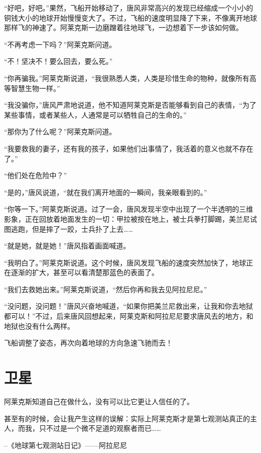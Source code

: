 “好吧，好吧。”果然，飞船开始移动了，唐风非常高兴的发现已经缩成一个小小的铜钱大小的地球开始慢慢变大了。不过，飞船的速度明显降了下来，不像离开地球那样飞的神速了。阿莱克斯一边磨蹭着往地球飞，一边想着下一步该如何做。

“不再考虑一下吗？”阿莱克斯问道。

“不！坚决不！要么回去，要么死。”

“你再骗我。”阿莱克斯说道，“我很熟悉人类，人类是珍惜生命的物种，就像所有高等智慧生物一样。”

“我没骗你，”唐风严肃地说道，他不知道阿莱克斯是否能够看到自己的表情，“为了某些事情，或者某些人，人通常是可以牺牲自己的生命的。”

“那你为了什么呢？”阿莱克斯问道。

“我要救我的妻子，还有我的孩子，如果他们出事情了，我活着的意义也就不存在了。”

“他们处在危险中？”

“是的，”唐风说道，“就在我们离开地面的一瞬间，我亲眼看到的。”

“你等一下。”阿莱克斯说道。过了一会，唐风发现半空中出现了一个半透明的三维影象，正在回放着地面发生的一切：甲拉被按在地上，被士兵拳打脚踢，美兰尼试图逃跑，但是摔了一跤，士兵扑了上去……

“就是她，就是她！”唐风指着画面喊道。

“我明白了。”阿莱克斯说道。这个时候，唐风发现飞船的速度突然加快了，地球正在逐渐的扩大，甚至可以看清楚那蓝色的表面了。

“我们去救她出来。”阿莱克斯说道，“然后你再和我去见阿拉尼尼。”

“没问题，没问题！”唐风兴奋地喊道，“如果你把美兰尼救出来，让我和你去地狱都可以！”不过，后来唐风回想起来，阿莱克斯和阿拉尼尼要求唐风去的地方，和地狱也没有什么两样。

飞船调整了姿态，再次向着地球的方向急速飞驰而去！

\chapter{卫星}

\begin{myquote}
阿莱克斯知道自己在做什么，没有可以比它更让人信任的了。

甚至有的时候，会让我产生这样的误解：实际上阿莱克斯才是第七观测站真正的主人，而我，只不过是一个微不足道的观察者而已……
\end{myquote}

\begin{myflushright}
--《地球第七观测站日记》——阿拉尼尼
\end{myflushright}

